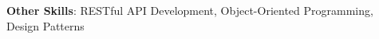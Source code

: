 \item{\textbf{Other Skills}{: RESTful API Development, Object-Oriented Programming, Design Patterns}}
